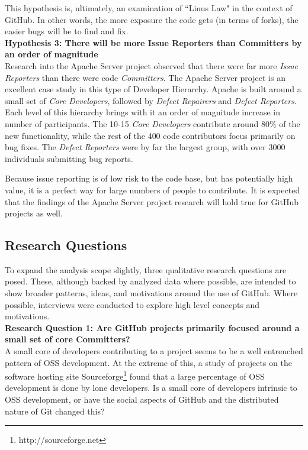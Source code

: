 \documentclass{proc}
\begin{document}
This hypothesis is, ultimately, an examination of ``Linus Law"\cite{raymond1999cathedral} in the context of GitHub. In other words, the more exposure the code gets (in terms of forks), the easier bugs will be to find and fix.\\

\noindent \textbf{Hypothesis 3: There will be more Issue Reporters than Committers by an order of magnitude}\\
Research into the Apache Server project observed that there were far more \emph{Issue Reporters} than there were code \emph{Committers}\cite{mockus2000case}. The Apache Server project is an excellent case study in this type of Developer Hierarchy. Apache is built around a small set of {\it Core Developers}, followed by {\it Defect Repairers} and {\it Defect Reporters}. Each level of this hierarchy brings with it an order of magnitude increase in number of participants. The 10-15 {\it Core Developers} contribute around 80\% of the new functionality, while the rest of the 400 code contributors focus primarily on bug fixes. The {\it Defect Reporters} were by far the largest group, with over 3000 individuals submitting bug reports.

Because issue reporting is of low risk to the code base, but has potentially high value, it is a perfect way for large numbers of people to contribute. It is expected that the findings of the Apache Server project research will hold true for GitHub projects as well.

\subsection{Research Questions}
To expand the analysis scope slightly, three qualitative research questions are posed. These, although backed by analyzed data where possible, are intended to show broader patterns, ideas, and motivations around the use of GitHub. Where possible, interviews\cite{begel2013social} were conducted to explore high level concepts and motivations.\\

\noindent \textbf{Research Question 1: Are GitHub projects primarily focused around a small set of core Committers?}\\
A small core of developers contributing to a project seems to be a well entrenched pattern of OSS development\cite{mockus2000case,mockus2002two,krishnamurthy2002cave}. At the extreme of this, a study of projects on the software hosting site Sourceforge\footnote{http://sourceforge.net} found that a large percentage of OSS development is done by lone developers\cite{krishnamurthy2002cave}. Is a small core of developers intrinsic to OSS development, or have the social aspects of GitHub and the distributed nature of Git changed this?\\
\end{document}
